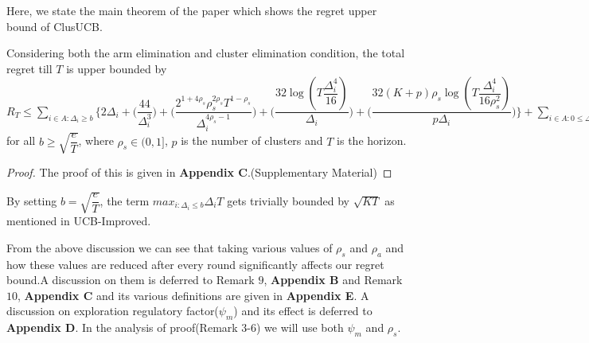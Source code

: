 	
	Here, we state the main theorem of the paper which shows the regret upper bound of ClusUCB.
	
\begin{theorem}
Considering both the arm elimination and cluster elimination condition, the total regret till $T$ is upper bounded by $R_{T}\leq \sum_{i\in A:\Delta_{i}\geq b} \bigg\lbrace 2\Delta_{i}+ \bigg(\dfrac{44}{\Delta_{i}^{3}}\bigg) + \bigg(\dfrac{2^{1+4\rho_{s}}\rho_{s}^{2\rho_{s}}T^{1-\rho_{s}}}{\Delta_{i}^{4\rho_{s}-1}}\bigg) + \bigg(\dfrac{32\log{(T\dfrac{\Delta_{i}^{4}}{16})}}{\Delta_{i}}\bigg) + \bigg(\dfrac{32(K+p)\rho_{s}\log{(T\dfrac{\Delta_{i}^{4}}{16\rho_{s}^{2}})}}{p\Delta_{i}}\bigg)\bigg\rbrace + \sum_{i\in A:0\leq\Delta_{i}\leq b}\bigg\lbrace \bigg(\dfrac{12}{b^{3}} \bigg) + \bigg(\dfrac{T^{1-\rho_{s}}\rho_{s}^{2\rho_{s}}2^{2\rho_{s}+\frac{3}{2}}}{\Delta_{i}^{4\rho_{s}-1}} \bigg)+\bigg(\dfrac{T^{1-\rho_{s}}\rho_{s}^{2\rho_{s}}2^{2\rho_{s}+\frac{3}{2}}}{b^{4\rho_{s} -1}} \bigg) \bigg\rbrace + max_{i:\Delta_{i}\leq b}\Delta_{i}T $ for all $b\geq \sqrt{\dfrac{e}{T}}$, where $\rho_{s}\in (0,1]$, $p$ is the number of clusters and $T$ is the horizon.
\end{theorem}

\begin{proof}
	The proof of this is given in \textbf{Appendix C}.(Supplementary Material)
\end{proof}

\begin{remark}
By setting $b=\sqrt{\dfrac{e}{T}}$, the term $max_{i:\Delta_{i}\leq b}\Delta_{i}T$ gets trivially bounded by $\sqrt{KT}$ as mentioned in UCB-Improved.
\end{remark}

\begin{remark}
From the above discussion we can see that taking various values of $\rho_{s}$ and $\rho_{a}$ and how these values are reduced after every round significantly affects our regret bound.A discussion on them is deferred to Remark $9$, \textbf{Appendix B} and Remark $10$, \textbf{Appendix C} and its various definitions are given in \textbf{Appendix E}. A discussion on exploration regulatory factor($\psi_{m}$) and its effect is deferred to \textbf{Appendix D}. In the analysis of proof(Remark $3$-$6$) we will use both $\psi_{m}$ and $\rho_{s}$.
\end{remark}

